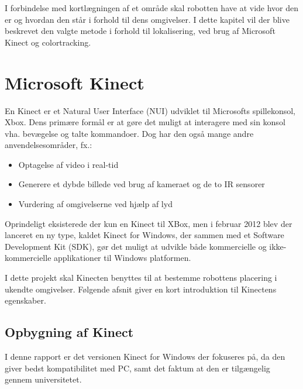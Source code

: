 I forbindelse med kortlægningen af et område skal robotten have at vide hvor den er og hvordan den står i forhold til dens omgivelser.
I dette kapitel vil der blive beskrevet den valgte metode i forhold til lokalisering, ved brug af Microsoft Kinect og colortracking.

 \section{Microsoft Kinect}\label{kinect}
En Kinect er et Natural User Interface (NUI) udviklet til Microsofts spillekonsol, Xbox.
Dens primære formål er at gøre det muligt at interagere med sin konsol vha. bevægelse og talte kommandoer.
Dog har den også mange andre anvendelsesområder, fx.:
%

\begin{itemize}
\item Optagelse af video i real-tid
\item Generere et dybde billede ved brug af kameraet og de to IR sensorer
\item Vurdering af omgivelserne ved hjælp af lyd
\end{itemize}

Oprindeligt eksisterede der kun en Kinect til XBox, men i februar 2012 blev der lanceret en ny type, kaldet Kinect for Windows, der sammen med et Software Development Kit (SDK), gør det muligt at udvikle både kommercielle og ikke-kommercielle applikationer til Windows platformen.

I dette projekt skal Kinecten benyttes til at bestemme robottens placering i ukendte omgivelser. 
Følgende afsnit giver en kort introduktion til Kinectens egenskaber.\cite{kinectProgrammingGuide}

\subsection{Opbygning af Kinect}\label{kinect:komponenter}
I denne rapport er det versionen Kinect for Windows der fokuseres på, da den giver bedst kompatibilitet med PC, samt det faktum at den er tilgængelig gennem universitetet.

